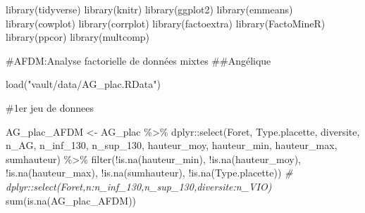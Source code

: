 \documentclass[
  12pt,
  american,
  a4paper,
  extrafontsizes,onecolumn,openright
  ]{memoir}
\newenvironment{Shaded}{\begin{snugshade}}{\end{snugshade}}
\newcommand{\CommentTok}[1]{\textcolor[rgb]{0.56,0.35,0.01}{\textit{#1}}}
\newcommand{\FunctionTok}[1]{\textcolor[rgb]{0.00,0.00,0.00}{#1}}
\newcommand{\NormalTok}[1]{#1}
\newcommand{\OtherTok}[1]{\textcolor[rgb]{0.56,0.35,0.01}{#1}}
\newcommand{\SpecialCharTok}[1]{\textcolor[rgb]{0.00,0.00,0.00}{#1}}
\newcommand{\StringTok}[1]{\textcolor[rgb]{0.31,0.60,0.02}{#1}}
\begin{document}
\normalsize

\scriptsize

\begin{Shaded}
\begin{Highlighting}[]
\FunctionTok{library}\NormalTok{(tidyverse)}
\FunctionTok{library}\NormalTok{(knitr)}
\FunctionTok{library}\NormalTok{(ggplot2)}
\FunctionTok{library}\NormalTok{(emmeans)}
\FunctionTok{library}\NormalTok{(cowplot)}
\FunctionTok{library}\NormalTok{(corrplot)}
\FunctionTok{library}\NormalTok{(factoextra)}
\FunctionTok{library}\NormalTok{(FactoMineR)}
\FunctionTok{library}\NormalTok{(ppcor)}
\FunctionTok{library}\NormalTok{(multcomp)}
\end{Highlighting}
\end{Shaded}

\normalsize

\#AFDM:Analyse factorielle de données mixtes
\#\#Angélique

\scriptsize

\begin{Shaded}
\begin{Highlighting}[]
\FunctionTok{load}\NormalTok{(}\StringTok{"vault/data/AG\_plac.RData"}\NormalTok{)}
\end{Highlighting}
\end{Shaded}

\normalsize

\#1er jeu de donnees

\scriptsize

\begin{Shaded}
\begin{Highlighting}[]
\NormalTok{AG\_plac\_AFDM }\OtherTok{\textless{}{-}}\NormalTok{ AG\_plac }\SpecialCharTok{\%\textgreater{}\%}
\NormalTok{    dplyr}\SpecialCharTok{::}\FunctionTok{select}\NormalTok{(Foret, Type.placette, diversite, n\_AG, n\_inf\_130,}
\NormalTok{        n\_sup\_130, hauteur\_moy, hauteur\_min, hauteur\_max, sumhauteur) }\SpecialCharTok{\%\textgreater{}\%}
    \FunctionTok{filter}\NormalTok{(}\SpecialCharTok{!}\FunctionTok{is.na}\NormalTok{(hauteur\_min), }\SpecialCharTok{!}\FunctionTok{is.na}\NormalTok{(hauteur\_moy), }\SpecialCharTok{!}\FunctionTok{is.na}\NormalTok{(hauteur\_max),}
        \SpecialCharTok{!}\FunctionTok{is.na}\NormalTok{(sumhauteur), }\SpecialCharTok{!}\FunctionTok{is.na}\NormalTok{(Type.placette))}
\CommentTok{\# dplyr::select(Foret,n:n\_inf\_130,n\_sup\_130,diversite:n\_VIO)}
\FunctionTok{sum}\NormalTok{(}\FunctionTok{is.na}\NormalTok{(AG\_plac\_AFDM))}
\end{Highlighting}
\end{Shaded}
\end{document}
